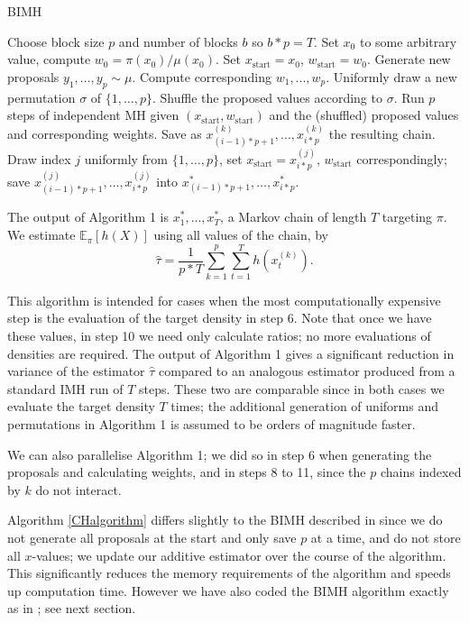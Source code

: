 \documentclass[11pt,a4paper]{article}
\begin{document}
\begin{algorithm}
 	\caption{BIMH}
 	\label{CHalgorithm}
 	\begin{algorithmic}[1]
		\State Choose block size $p$ and number of blocks $b$ so $b*p=T$. 		
 		\State Set $x_0$ to some arbitrary value, compute $w_0=\pi(x_0)/\mu(x_0)$.
 		\State Set $x_{\text{start}} = x_0$, $w_{\text{start}} = w_0$.
		\State Generate new proposals $y_1, ..., y_p\sim\mu$.
		\State Compute corresponding $w_1, ..., w_p$.
		\State Uniformly draw a new permutation $\sigma$ of $\{1, \dots, p\}$.
		\State Shuffle the proposed values according to $\sigma$.
 		\State Run $p$ steps of independent MH given $(x_{\text{start}}, w_{\text{start}})$ and the (shuffled) proposed values and corresponding weights.
 		\State Save as $x_{(i-1)*p+1}^{(k)} , ...,x_{i*p}^{(k)}$ the resulting chain.
 		\EndFor
 		\State Draw index $j$ uniformly from $\{1,\dots,p\}$, set $x_{\text{start}} = x_{i*p}^{(j)}$, $w_{\text{start}}$ correspondingly; save $x_{(i-1)*p+1}^{(j)},\dots,x_{i*p}^{(j)}$ into $x_{(i-1)*p+1}^*,\dots,x_{i*p}^*$.
		\EndFor 		
 	\end{algorithmic}
 \end{algorithm}
    

The output of Algorithm 1 is $x_1^*,\dots, x_T^*$, a Markov chain of length $T$ targeting $\pi$. We estimate $\mathbb{E}_\pi[h(X)]$ using all values of the chain, by $$\hat{\tau} = \frac{1}{p*T} \sum_{k=1}^p \sum_{t=1}^T h(x_t^{(k)}).$$

This algorithm is intended for cases when the most computationally expensive step is the evaluation of the target density in step 6. Note that once we have these values, in step 10 we need only calculate ratios; no more evaluations of densities are required. The output of Algorithm 1 gives a significant reduction in variance of the estimator $\hat{\tau}$ compared to an analogous estimator produced from a standard IMH run of $T$ steps. These two are comparable since in both cases we evaluate the target density $T$ times; the additional generation of uniforms and permutations in Algorithm 1 is assumed to be orders of magnitude faster.

We can also parallelise Algorithm 1; we did so in step 6 when generating the proposals and calculating weights, and in steps 8 to 11, since the $p$ chains indexed by $k$ do not interact.

Algorithm \ref{CHalgorithm} differs slightly to the BIMH described in \cite{Jacob} since we do not generate all proposals at the start and only save $p$ at a time, and do not store all $x$-values; we update our additive estimator over the course of the algorithm. This significantly reduces the memory requirements of the algorithm and speeds up computation time. However we have also coded the BIMH algorithm exactly as in \cite{Jacob}; see next section.
\end{document}
